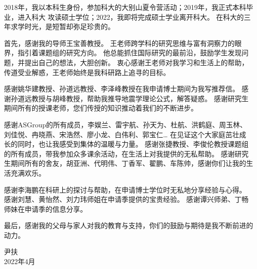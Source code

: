 
\begin{acknowledgements}

2018年，我以本科生身份，参加科大的大别山夏令营活动；2019年，我正式本科毕业，进入科大
攻读硕士学位；2022，我即将完成硕士学业离开科大。
在科大的三年求学时光，是短暂却弥足珍贵的。

首先，感谢我的导师王宝善教授。
王老师跨学科的研究思维与富有洞察力的眼界，指引着课题组的研究方向。
他总能抓住国际研究的最前沿，鼓励学生发现问题，并提出自己的想法，大胆创新。
衷心感谢王老师对我学习和生活上的帮助，传道受业解惑，王老师始终是我科研路上追寻的目标。

感谢姚华建教授、孙道远教授、李泽峰教授在我申请博士期间为我写推荐信。
感谢孙道远教授与胡峰教授，帮助我推导地震学理论公式，解答疑惑。
感谢研究生期间所有的授课老师，您们传授的知识推动着我们的不断进步。

感谢ASGroup的所有成员，李娱兰、雷宇航、孙天为、杜航、洪鹤庭、周玉林、刘佳悦、冉晓燕、宋浩然、廖小龙、白伟利、郭宝仁\dots
在见证这个大家庭茁壮成长的同时，也让我感受到集体的温暖与力量。
感谢张捷教授、李俊伦教授课题组的所有成员，带我参加众多课余活动，在生活上对我提供的无私帮助。
感谢研究生期间所有的舍友，胡亚洲、代明伟、丁香军、翟鹏、车陈帅，感谢你们让我的生活充满欢乐。

感谢李海鹏在科研上的探讨与帮助，在申请博士学位时无私地分享经验与心得。
感谢刘慧、黄怡然、刘力玮师姐在申请季提供的宝贵经验。
感谢谭兴师弟、丁畅师妹在申请季的信息分享。

最后，感谢我的父母与家人对我的教育与支持，你们的鼓励与期待是我不断前进的动力。

\begin{flushright} 
尹扶\\
2022年4月
\end{flushright}


\end{acknowledgements}
